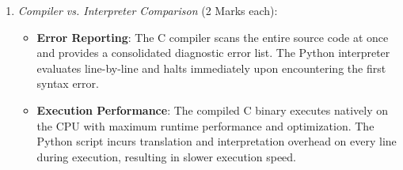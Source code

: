 \begin{solutionbox}
\begin{enumerate}[start=8]
\begin{enumerate}[label=(\alph*)]
        \item \textit{Compiler vs. Interpreter Comparison} (2 Marks each):
        \begin{itemize}
            \item \textbf{Error Reporting}: The C compiler scans the entire source code at once and provides a consolidated diagnostic error list. The Python interpreter evaluates line-by-line and halts immediately upon encountering the first syntax error.
            \item \textbf{Execution Performance}: The compiled C binary executes natively on the CPU with maximum runtime performance and optimization. The Python script incurs translation and interpretation overhead on every line during execution, resulting in slower execution speed.
        \end{itemize}
    \end{enumerate}
\end{enumerate}
\end{solutionbox}
